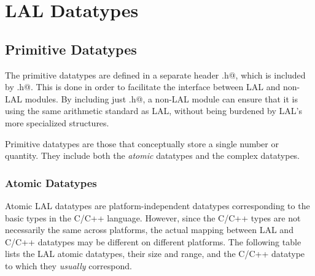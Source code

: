 \documentclass[10pt]{ligodcc}
\begin{document}
\section{LAL Datatypes}

\subsection{Primitive Datatypes}

The primitive datatypes are defined in a separate header
\verb@LALAtomicDatatypes.h@, which is included by
\verb@LALDatatypes.h@.  This is done in order to facilitate the
interface between LAL and non-LAL modules.  By including just
\verb@LALAtomicDatatypes.h@, a non-LAL module can ensure that it is
using the same arithmetic standard as LAL, without being burdened by
LAL's more specialized structures.

Primitive datatypes are those that conceptually store a single number
or quantity.  They include both the \emph{atomic} datatypes and the
complex datatypes.

\subsubsection*{Atomic Datatypes}

Atomic LAL datatypes are platform-independent datatypes corresponding
to the basic types in the C/C++ language.  However, since the C/C++
types are not necessarily the same across platforms, the actual
mapping between LAL and C/C++ datatypes may be different on different
platforms.  The following table lists the LAL atomic datatypes, their
size and range, and the C/C++ datatype to which they \emph{usually}
correspond.
\end{document}
